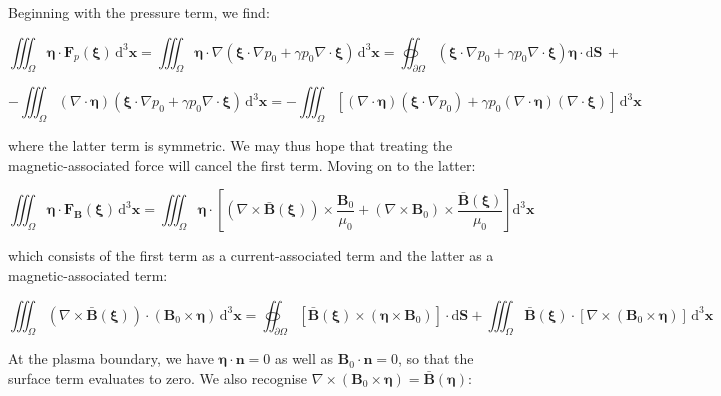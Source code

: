 Beginning with the pressure term, we find:

\begin{equation*}
    \iiint_\Omega\boldsymbol{\eta}\cdot\mathbf{F}_p(\boldsymbol{\xi})\,\mathrm{d}^3\mathbf{x}=\iiint_\Omega\boldsymbol{\eta}\cdot\nabla(\boldsymbol{\xi}\cdot\nabla p_0+\gamma p_0\nabla\cdot\boldsymbol{\xi})\,\mathrm{d}^3\mathbf{x}=\oiint_{\partial\Omega}(\boldsymbol{\xi}\cdot\nabla p_0+\gamma p_0\nabla\cdot\boldsymbol{\xi})\boldsymbol{\eta}\cdot\mathrm{d}\mathbf{S}\,+
\end{equation*}

\begin{equation}
    \label{eq-inst-10}
    -\iiint_\Omega(\nabla\cdot\boldsymbol{\eta})(\boldsymbol{\xi}\cdot\nabla p_0+\gamma p_0\nabla\cdot\boldsymbol{\xi})\,\mathrm{d}^3\mathbf{x}=-\iiint_\Omega\left[(\nabla\cdot\boldsymbol{\eta})(\boldsymbol{\xi}\cdot\nabla p_0)+\gamma p_0(\nabla\cdot\boldsymbol{\eta})(\nabla\cdot\boldsymbol{\xi})\right]\,\mathrm{d}^3\mathbf{x}
\end{equation}

where the latter term is symmetric. We may thus hope that treating the magnetic-associated force will cancel the first term. Moving on to the latter:

\begin{equation}
    \iiint_\Omega\boldsymbol{\eta}\cdot\mathbf{F}_\mathbf{B}(\boldsymbol{\xi})\,\mathrm{d}^3\mathbf{x}=\iiint_\Omega\boldsymbol{\eta}\cdot\left[(\nabla\times\bar{\mathbf{B}}(\boldsymbol{\xi}))\times\frac{\mathbf{B}_0}{\mu_0}+(\nabla\times\mathbf{B}_0)\times\frac{\bar{\mathbf{B}}(\boldsymbol{\xi})}{\mu_0}\right]\mathrm{d}^3\mathbf{x}
\end{equation}

which consists of the first term as a current-associated term and the latter as a magnetic-associated term:

\begin{equation}
    \iiint_\Omega(\nabla\times\bar{\mathbf{B}}(\boldsymbol{\xi}))\cdot(\mathbf{B}_0\times\boldsymbol{\eta})\,\mathrm{d}^3\mathbf{x}=\oiint_{\partial\Omega}\left[\bar{\mathbf{B}}(\boldsymbol{\xi})\times(\boldsymbol{\eta}\times\mathbf{B}_0)\right]\cdot\mathrm{d}\mathbf{S}+\iiint_\Omega\bar{\mathbf{B}}(\boldsymbol{\xi})\cdot\left[\nabla\times(\mathbf{B}_0\times\boldsymbol{\eta})\right]\,\mathrm{d}^3\mathbf{x}
\end{equation}

At the plasma boundary, we have $\boldsymbol{\eta}\cdot\mathbf{n}=0$ as well as $\mathbf{B}_0\cdot\mathbf{n}=0$, so that the surface term evaluates to zero. We also recognise $\nabla\times(\mathbf{B}_0\times\boldsymbol{\eta})=\bar{\mathbf{B}}(\boldsymbol{\eta})$:

